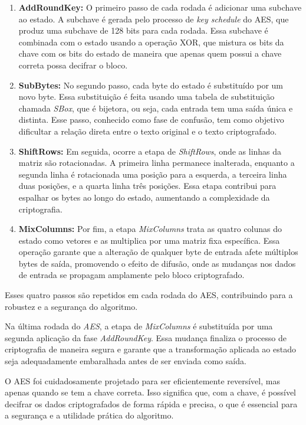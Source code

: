 \begin{enumerate}
\item \textbf{AddRoundKey:} O primeiro passo de cada rodada é adicionar uma subchave ao estado.
  A subchave é gerada pelo processo de \textit{key schedule} do AES, que produz uma subchave de 128 bits para cada rodada.
  Essa subchave é combinada com o estado usando a operação XOR, que mistura os bits da chave com os bits do estado de maneira que apenas quem possui a chave correta possa decifrar o bloco.

\item \textbf{SubBytes:} No segundo passo, cada byte do estado é substituído por um novo byte.
  Essa substituição é feita usando uma tabela de substituição chamada \textit{SBox}, que é bijetora, ou seja, cada entrada tem uma saída única e distinta.
  Esse passo, conhecido como fase de confusão, tem como objetivo dificultar a relação direta entre o texto original e o texto criptografado.

\item \textbf{ShiftRows:} Em seguida, ocorre a etapa de \textit{ShiftRows}, onde as linhas da matriz são rotacionadas.
  A primeira linha permanece inalterada, enquanto a segunda linha é rotacionada uma posição para a esquerda, a terceira linha duas posições, e a quarta linha três posições.
  Essa etapa contribui para espalhar os bytes ao longo do estado, aumentando a complexidade da criptografia.

\item \textbf{MixColumns:} Por fim, a etapa \textit{MixColumns} trata as quatro colunas do estado como vetores e as multiplica por uma matriz fixa específica.
  Essa operação garante que a alteração de qualquer byte de entrada afete múltiplos bytes de saída, promovendo o efeito de difusão, onde as mudanças nos dados de entrada se propagam amplamente pelo bloco criptografado.
\end{enumerate}

Esses quatro passos são repetidos em cada rodada do AES, contribuindo para a robustez e a segurança do algoritmo.

Na última rodada do \textit{AES}, a etapa de \textit{MixColumns} é substituída por uma segunda aplicação da fase \textit{AddRoundKey}.
Essa mudança finaliza o processo de criptografia de maneira segura e garante que a transformação aplicada ao estado seja adequadamente embaralhada antes de ser enviada como saída.

O AES foi cuidadosamente projetado para ser eficientemente reversível, mas apenas quando se tem a chave correta.
Isso significa que, com a chave, é possível decifrar os dados criptografados de forma rápida e precisa, o que é essencial para a segurança e a utilidade prática do algoritmo.

